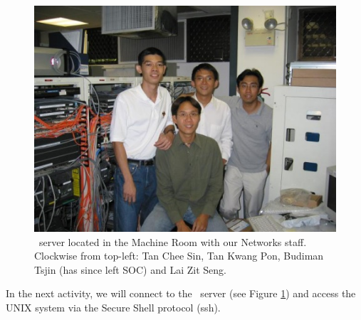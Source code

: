 \begin{frame}
\begin{figure}
\begin{center}
\includegraphics[scale=0.5]{machine_room}
\caption{\sunfire\ server located in the Machine Room with our Networks
staff. Clockwise from top-left: Tan Chee Sin, Tan Kwang Pon, Budiman Tsjin
(has since left SOC) and Lai Zit Seng.}
\label{fig:sunfire}
\end{center}
\end{figure}
\end{frame}

In the next activity, we will connect to the \sunfire\ server (see Figure
\ref{fig:sunfire}) and access the UNIX system via the Secure Shell protocol
(ssh).


